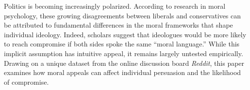 Politics is becoming increasingly polarized. According to research in moral psychology, these growing disagreements between liberals and conservatives can be attributed to fundamental differences in the moral frameworks that shape individual ideology. Indeed, scholars suggest that ideologues would be more likely to reach compromise if both sides spoke the same ``moral language.'' While this implicit assumption has intuitive appeal, it remains largely untested empirically. Drawing on a unique dataset from the online discussion board \emph{Reddit}, this paper examines how moral appeals can affect individual persuasion and the likelihood of compromise. %